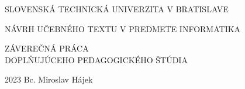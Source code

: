 \thispagestyle{empty}
{\centering
	{\Large \MakeUppercase{Slovenská technická univerzita v Bratislave}}
	\vfill
	{{\Large \MakeUppercase{Návrh učebného textu v predmete Informatika}} \par
	\vspace{2\bigskipamount}
	{\Large \MakeUppercase{Záverečná práca \\ Doplňujúceho pedagogického štúdia}}}
	\vfill
}
{\large  
\begin{flushleft}
{\Large 2023 \hfill
Bc. Miroslav Hájek}
\end{flushleft}
}
